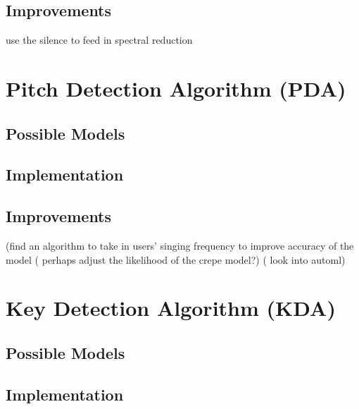 \subsection{Improvements}
use the silence to feed in spectral reduction


\section{Pitch Detection Algorithm (PDA)}


\subsection{Possible Models}


\subsection{Implementation}


\subsection{Improvements}
(find an algorithm to take in users’ singing frequency to improve accuracy of the model ( perhaps adjust the likelihood of the crepe model?) ( look into automl)

\section{Key Detection Algorithm (KDA)}

\subsection{Possible Models}


\subsection{Implementation}
